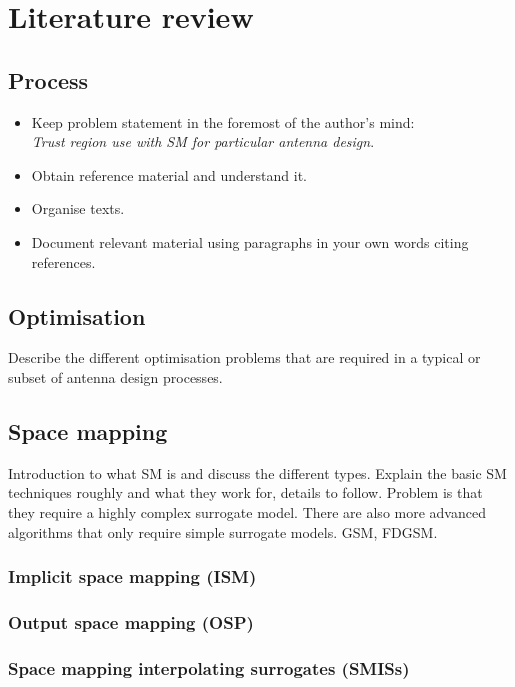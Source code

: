 \chapter{Literature review}
\label{chp:LitReview}

\section*{Process}
\begin{itemize}
\item Keep problem statement in the foremost of the author's mind: \\ \textit{Trust region use with SM for particular antenna design}.
\item Obtain reference material and understand it.
\item Organise texts.
\item Document relevant material using paragraphs in your own words citing references.
\end{itemize}

\section{Optimisation}
Describe the different optimisation problems that are required in a typical or subset of antenna design processes.

\section{Space mapping}
Introduction to what SM is and discuss the different types. Explain the basic SM techniques roughly and what they work for, details to follow. Problem is that they require a highly complex surrogate model. There are also more advanced algorithms that only require simple surrogate models. GSM, FDGSM.
\subsection{Implicit space mapping (ISM)}
\subsection{Output space mapping (OSP)}
\subsection{Space mapping interpolating surrogates (SMISs)}
